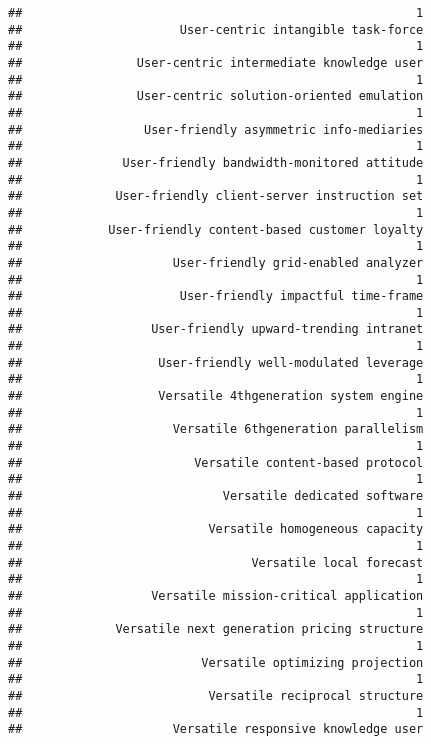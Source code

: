\documentclass[
]{article}
\begin{document}
\begin{verbatim}
##                                                       1 
##                      User-centric intangible task-force 
##                                                       1 
##                User-centric intermediate knowledge user 
##                                                       1 
##                User-centric solution-oriented emulation 
##                                                       1 
##                 User-friendly asymmetric info-mediaries 
##                                                       1 
##              User-friendly bandwidth-monitored attitude 
##                                                       1 
##             User-friendly client-server instruction set 
##                                                       1 
##            User-friendly content-based customer loyalty 
##                                                       1 
##                     User-friendly grid-enabled analyzer 
##                                                       1 
##                      User-friendly impactful time-frame 
##                                                       1 
##                  User-friendly upward-trending intranet 
##                                                       1 
##                   User-friendly well-modulated leverage 
##                                                       1 
##                   Versatile 4thgeneration system engine 
##                                                       1 
##                     Versatile 6thgeneration parallelism 
##                                                       1 
##                        Versatile content-based protocol 
##                                                       1 
##                            Versatile dedicated software 
##                                                       1 
##                          Versatile homogeneous capacity 
##                                                       1 
##                                Versatile local forecast 
##                                                       1 
##                  Versatile mission-critical application 
##                                                       1 
##             Versatile next generation pricing structure 
##                                                       1 
##                         Versatile optimizing projection 
##                                                       1 
##                          Versatile reciprocal structure 
##                                                       1 
##                     Versatile responsive knowledge user 

\end{verbatim}
\end{document}
